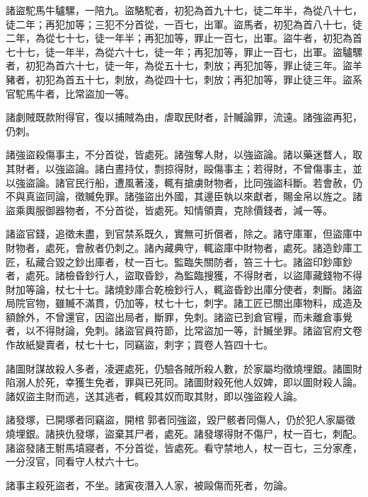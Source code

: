 \begin{pinyinscope}
 諸盜駝馬牛驢騾，一陪九。盜駱駝者，初犯為首九十七，徒二年半，為從八十七，徒二年；再犯加等；三犯不分首從，一百七，出軍。盜馬者，初犯為首八十七，徒二年，為從七十七，徒一年半；再犯加等，罪止一百七，出軍。盜牛者，初犯為首七十七，徒一年半，為從六十七，徒一年；再犯加等，罪止一百七，出軍。盜驢騾者，初犯為首六十七，徒一年，為從五十七，刺放；再犯加等，罪止徒三年。盜羊豬者，初犯為首五十七，刺放，為從四十七，刺放；再犯加等，罪止徒三年。盜系官駝馬牛者，比常盜加一等。



 諸劇賊既款附得官，復以捕賊為由，虐取民財者，計贓論罪，流遠。諸強盜再犯，仍刺。



 諸強盜殺傷事主，不分首從，皆處死。諸強奪人財，以強盜論。諸以藥迷瞀人，取其財者，以強盜論。諸白晝持仗，剽掠得財，毆傷事主；若得財，不曾傷事主，並以強盜論。諸官民行船，遭風著淺，輒有搶虜財物者，比同強盜科斷。若會赦，仍不與真盜同論，徵贓免罪。諸強盜出外國，其邊臣執以來獻者，賜金帛以旌之。諸盜乘輿服御器物者，不分首從，皆處死。知情領賣，克除價錢者，減一等。



 諸盜官錢，追徵未盡，到官禁系既久，實無可折償者，除之。諸守庫軍，但盜庫中財物者，處死，會赦者仍刺之。諸內藏典守，輒盜庫中財物者，處死。諸造鈔庫工匠，私藏合毀之鈔出庫者，杖一百七。監臨失關防者，笞三十七。諸盜印鈔庫鈔者，處死。諸檢昏鈔行人，盜取昏鈔，為監臨搜獲，不得財者，以盜庫藏錢物不得財加等論，杖七十七。諸燒鈔庫合乾檢鈔行人，輒盜昏鈔出庫分使者，刺斷。諸盜局院官物，雖贓不滿貫，仍加等，杖七十七，刺字。諸工匠已關出庫物料，成造及額餘外，不曾還官，因盜出局者，斷罪，免刺。諸盜已到倉官糧，而未離倉事覺者，以不得財論，免刺。諸盜官員符節，比常盜加一等，計贓坐罪。諸盜官府文卷作故紙變賣者，杖七十七，同竊盜，刺字；買卷人笞四十七。



 諸圖財謀故殺人多者，凌遲處死，仍驗各賊所殺人數，於家屬均徵燒埋銀。諸圖財陷溺人於死，幸獲生免者，罪與已死同。諸圖財殺死他人奴婢，即以圖財殺人論。諸奴盜主財而逃，送其逃者，輒殺其奴而取其財，即以強盜殺人論。



 諸發塚，已開塚者同竊盜，開棺郭者同強盜，毀尸骸者同傷人，仍於犯人家屬徵燒埋銀。諸挾仇發塚，盜棄其尸者，處死。諸發塚得財不傷尸，杖一百七，刺配。諸盜發諸王駙馬墳寢者，不分首從，皆處死。看守禁地人，杖一百七，三分家產，一分沒官，同看守人杖六十七。



 諸事主殺死盜者，不坐。諸寅夜潛入人家，被毆傷而死者，勿論。




\end{pinyinscope}

